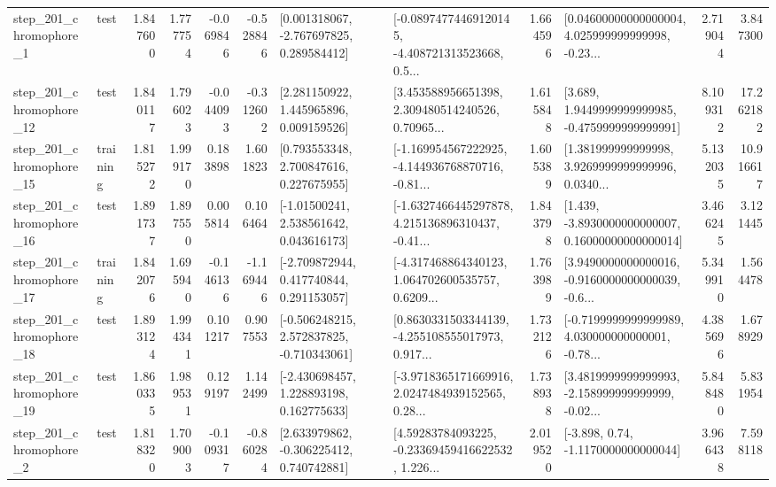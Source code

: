 \begin{tabular}{llrrrrllrlrr}
   step\_201\_chromophore\_1 &      test &      1.847600 &    1.777754 &     -0.069846 & -0.528846 &    [0.001318067, -2.767697825, 0.289584412] &  [-0.08974774469120145, -4.408721313523668, 0.5... &       1.664596 &  [0.04600000000000004, 4.025999999999998, -0.23... &            2.719044 &          3.847300 \\
  step\_201\_chromophore\_12 &      test &      1.840117 &    1.796023 &     -0.044093 & -0.312602 &     [2.281150922, 1.445965896, 0.009159526] &  [3.453588956651398, 2.309480514240526, 0.70965... &       1.615848 &   [3.689, 1.9449999999999985, -0.4759999999999991] &            8.109312 &         17.262182 \\
  step\_201\_chromophore\_15 &  training &      1.815272 &    1.999170 &      0.183898 &  1.601823 &     [0.793553348, 2.700847616, 0.227675955] &  [-1.169954567222925, -4.144936768870716, -0.81... &       1.605389 &  [1.381999999999998, 3.9269999999999996, 0.0340... &            5.132035 &         10.916617 \\
  step\_201\_chromophore\_16 &      test &      1.891737 &    1.897550 &      0.005814 &  0.106464 &     [-1.01500241, 2.538561642, 0.043616173] &  [-1.6327466445297878, 4.215136896310437, -0.41... &       1.843798 &  [1.439, -3.8930000000000007, 0.16000000000000014] &            3.466245 &          3.121445 \\
  step\_201\_chromophore\_17 &  training &      1.842076 &    1.695940 &     -0.146136 & -1.169446 &    [-2.709872944, 0.417740844, 0.291153057] &  [-4.317468864340123, 1.064702600535757, 0.6209... &       1.763989 &  [3.9490000000000016, -0.9160000000000039, -0.6... &            5.349910 &          1.564478 \\
  step\_201\_chromophore\_18 &      test &      1.893124 &    1.994341 &      0.101217 &  0.907553 &   [-0.506248215, 2.572837825, -0.710343061] &  [0.8630331503344139, -4.255108555017973, 0.917... &       1.732126 &  [-0.7199999999999989, 4.030000000000001, -0.78... &            4.385696 &          1.678929 \\
  step\_201\_chromophore\_19 &      test &      1.860335 &    1.989531 &      0.129197 &  1.142499 &    [-2.430698457, 1.228893198, 0.162775633] &  [-3.9718365171669916, 2.0247484939152565, 0.28... &       1.738938 &  [3.4819999999999993, -2.158999999999999, -0.02... &            5.848480 &          5.831954 \\
   step\_201\_chromophore\_2 &      test &      1.818320 &    1.709003 &     -0.109317 & -0.860284 &    [2.633979862, -0.306225412, 0.740742881] &  [4.59283784093225, -0.23369459416622532, 1.226... &       2.019520 &                [-3.898, 0.74, -1.1170000000000044] &            3.966438 &          7.598118 \\

\end{tabular}
